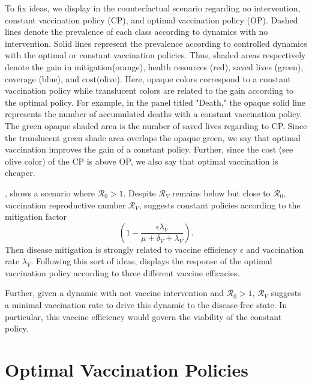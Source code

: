     To fix ideas,  we display in  the
counterfactual scenario regarding no intervention, constant vaccination
policy (CP), and optimal vaccination policy (OP).
 Dashed lines denote the
prevalence of each class according to dynamics with no intervention. Solid
lines represent the prevalence according to controlled dynamics with the
optimal or constant vaccination policies. Thus, shaded areas respectively
denote the gain in mitigation(orange), health resources (red), saved lives
(green), coverage (blue), and cost(olive). Here, opaque colors correspond to
a constant vaccination policy while translucent colors are related to the
gain according to the optimal policy. For example, in the panel titled
"Death," the opaque solid line represents the number of accumulated deaths
with a constant vaccination policy. The green opaque shaded area is the
number of saved lives regarding to CP. Since the translucent green shade
area overlaps the opaque green, we say that optimal vaccination improves the
gain of a constant policy. Further, since the cost (see olive color) of the
CP is above OP, we also say that optimal vaccination is cheaper.
%

, shows a scenario where
$\mathcal{R}_0>1$.
Despite $\mathcal{R}_V$ remains below but close to $\mathcal{R}_0$,
vaccination reproductive number $\mathcal{R}_V$, suggests constant policies
according to the mitigation factor
$$
    \left(
        1 -
        \frac{\epsilon \lambda_V}{\mu+\delta_V+\lambda_V}
    \right).
$$
Then disease mitigation is strongly related to vaccine efficiency
$\epsilon$ and vaccination rate $\lambda_V$. Following this sort of ideas,
 displays the
response of the optimal vaccination policy according to three different vaccine
efficacies.


Further, given a dynamic with
not vaccine intervention and $\mathcal{R}_0>1$, $\mathcal{R}_V$ suggests
a minimal vaccination rate to drive this dynamic to the disease-free state.
In particular, this vaccine efficiency would govern the viability of the
constant policy.

\section{Optimal Vaccination Policies}

